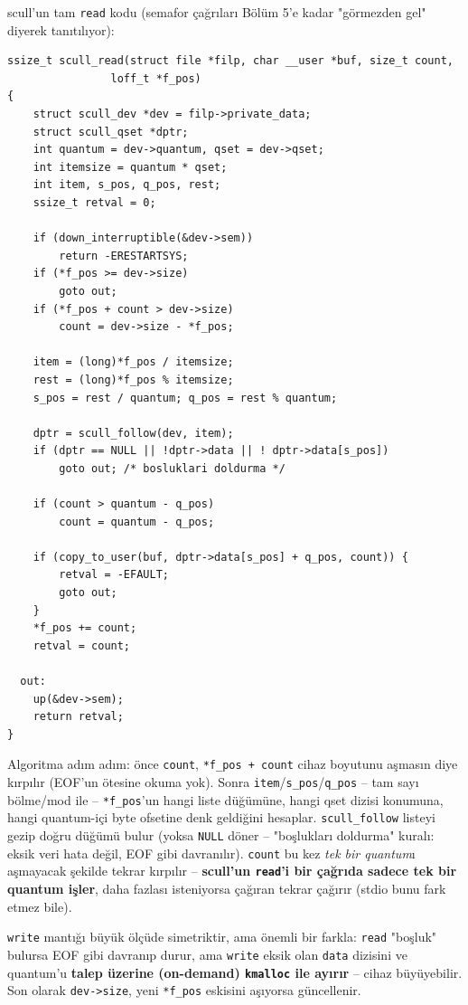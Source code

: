 \documentclass[11pt,a4paper]{article}
\begin{document}
scull'un tam \texttt{read} kodu (semafor çağrıları Bölüm 5'e kadar
"görmezden gel" diyerek tanıtılıyor):

\begin{lstlisting}
ssize_t scull_read(struct file *filp, char __user *buf, size_t count,
                loff_t *f_pos)
{
    struct scull_dev *dev = filp->private_data;
    struct scull_qset *dptr;
    int quantum = dev->quantum, qset = dev->qset;
    int itemsize = quantum * qset;
    int item, s_pos, q_pos, rest;
    ssize_t retval = 0;

    if (down_interruptible(&dev->sem))
        return -ERESTARTSYS;
    if (*f_pos >= dev->size)
        goto out;
    if (*f_pos + count > dev->size)
        count = dev->size - *f_pos;

    item = (long)*f_pos / itemsize;
    rest = (long)*f_pos % itemsize;
    s_pos = rest / quantum; q_pos = rest % quantum;

    dptr = scull_follow(dev, item);
    if (dptr == NULL || !dptr->data || ! dptr->data[s_pos])
        goto out; /* bosluklari doldurma */

    if (count > quantum - q_pos)
        count = quantum - q_pos;

    if (copy_to_user(buf, dptr->data[s_pos] + q_pos, count)) {
        retval = -EFAULT;
        goto out;
    }
    *f_pos += count;
    retval = count;

  out:
    up(&dev->sem);
    return retval;
}
\end{lstlisting}

Algoritma adım adım: önce \texttt{count}, \texttt{*f\_pos + count}
cihaz boyutunu aşmasın diye kırpılır (EOF'un ötesine okuma yok).
Sonra \texttt{item}/\texttt{s\_pos}/\texttt{q\_pos} -- tam sayı
bölme/mod ile -- \texttt{*f\_pos}'un hangi liste düğümüne, hangi
qset dizisi konumuna, hangi quantum-içi byte ofsetine denk geldiğini
hesaplar. \texttt{scull\_follow} listeyi gezip doğru düğümü bulur
(yoksa \texttt{NULL} döner -- "boşlukları doldurma" kuralı: eksik veri
hata değil, EOF gibi davranılır). \texttt{count} bu kez \emph{tek bir
quantum}ı aşmayacak şekilde tekrar kırpılır -- \textbf{scull'un
\texttt{read}'i bir çağrıda sadece tek bir quantum işler}, daha
fazlası isteniyorsa çağıran tekrar çağırır (stdio bunu fark etmez
bile).

\texttt{write} mantığı büyük ölçüde simetriktir, ama önemli bir
farkla: \texttt{read} "boşluk" bulursa EOF gibi davranıp durur, ama
\texttt{write} eksik olan \texttt{data} dizisini ve quantum'u
\textbf{talep üzerine (on-demand) \texttt{kmalloc} ile ayırır} --
cihaz büyüyebilir. Son olarak \texttt{dev->size}, yeni
\texttt{*f\_pos} eskisini aşıyorsa güncellenir.
\end{document}
